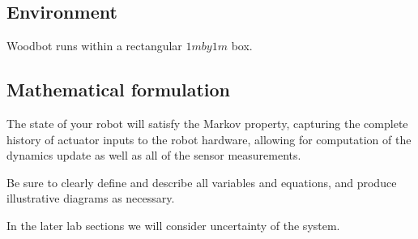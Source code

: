 \documentclass[letterpaper,11pt]{article}
\begin{document}

\subsection{Environment}
Woodbot runs within a rectangular $1m by 1m$ box.

\subsection{Mathematical formulation}
The state of your robot will satisfy the Markov property, capturing the complete history of actuator inputs to the robot hardware, allowing for computation of the dynamics update as well as all of the sensor measurements.  

Be sure to clearly define and describe all variables and equations, and produce illustrative diagrams as necessary.  

In the later lab sections we will consider uncertainty of the system. 
\end{document}
